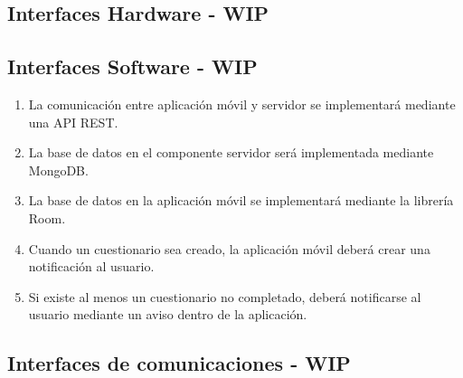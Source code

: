     \subsection{Interfaces Hardware - WIP}
        \label{req:interfaces:hardware}
    
    \subsection{Interfaces Software - WIP}
        \label{req:interfaces:software}
        \begin{enumerate}[label=\textbf{\texttt{RIS-\arabic*}}]
            \item La comunicación entre aplicación móvil y servidor se implementará mediante una API REST.
            \item La base de datos en el componente servidor será implementada mediante MongoDB.
            \item La base de datos en la aplicación móvil se implementará mediante la librería Room.
            \item Cuando un cuestionario sea creado, la aplicación móvil deberá crear una notificación al usuario.
            \item Si existe al menos un cuestionario no completado, deberá notificarse al usuario mediante un aviso dentro de la aplicación.
    
        \end{enumerate}
    
    \subsection{Interfaces de comunicaciones - WIP}
        \label{req:interfaces:comnicaciones}
    

